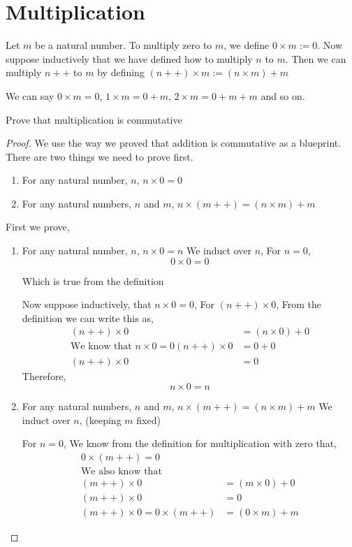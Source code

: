 \documentclass[11pt]{report}
\begin{document}
\section{Multiplication}
\begin{definition}[Multiplication]
	Let $m$ be a natural number. To multiply zero to $m$, we define $0 \times m := 0$. Now suppose inductively that we have defined how to multiply $n$ to $m$. Then we can multiply $n++$ to $m$ by defining $(n++) \times m := (n \times m) + m$
\end{definition}
We can say \(0 \times m = 0\), \(1 \times m = 0 + m\), \(2 \times m= 0 + m + m\) and so on.
\begin{lemma}
	Prove that multiplication is commutative
\end{lemma}
\begin{proof}
	We use the way we proved that addition is commutative as a blueprint.
	There are two things we need to prove first.
	\begin{enumerate}
		\item For any natural number, $n$, $n \times 0 = 0$
		\item For any natural numbers, $n$ and $m$, $n \times (m++) = (n \times m) + m$
	\end{enumerate}

	First we prove,
	\begin{enumerate}
		\item For any natural number, $n$, $n \times 0 = n$
		      We induct over $n$,
		      For $n = 0$,
		      $$0 \times 0 = 0$$

		      Which is true from the definition

		      Now suppose inductively, that $n \times 0 = 0$,
		      For $(n++) \times 0$,
		      From the definition we can write this as,
		      \begin{align*}
			      (n++) \times 0 & = (n \times 0) + 0 \\
			      \text{We know that $n \times 0 = 0$}
			      (n++) \times 0 & = 0 + 0            \\
			      (n++) \times 0 & = 0
		      \end{align*}
		      Therefore, $$n \times 0 = n$$
		\item 	For any natural numbers, $n$ and $m$, $n \times (m++) = (n \times m) + m$
		      We induct over $n$, (keeping $m$ fixed)

		      For $n = 0$,
		      We know from the definition for multiplication with zero that,
		      \begin{align*}
			      0 \times (m++) = 0                                    \\
			      \text{We also know that}                              \\
			      (m++) \times 0                  & = (m \times 0 ) + 0 \\
			      (m++) \times 0                  & = 0                 \\
			      (m++) \times 0 = 0 \times (m++) & = (0 \times m) + m
		      \end{align*}


\end{enumerate}
\end{proof}
\end{document}

